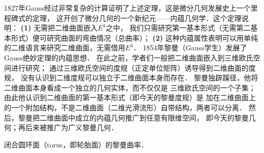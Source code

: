 1827年Gauss经过非常复杂的计算证明了上述定理，这是微分几何发展史上一个里程碑式的定理，
这开创了微分几何的一个新纪元——内蕴几何学．这个定理说明：
{\bfseries (1)} 无需把二维曲面嵌入$E^3$之中，
我们只需研究第一基本形式（无需第二基本形式）便可研究曲面的{\kaishu 弯曲情况}（总曲率）；
{\bfseries (2)} 这种{\kaishu 内蕴}属性表明可以用单纯的二维语言来研究二维曲面，无需借用$E^3$．
1854年黎曼（Gauss学生）发展了Gauss绝妙定理的内蕴思想．
在此之前，学者们一般把二维曲面嵌入到三维欧氏空间进行研究；
通过三维欧氏空间的度规（正定单位矩阵）诱导得到二维曲面的度规，
没有认识到二维度规可以独立于二维曲面本身而存在．
黎曼独辟蹊径，他将二维曲面本身看成一个独立的几何实体，而不仅仅是
三维欧氏空间的一个子集；由此他认识到二维曲面的第一基本形式（即今天的黎曼度规）是
加在二维曲面上的一个附加结构，不是二维曲面（二维光滑流形）自带结构，两者可以分离．
然后，黎曼把二维曲面中成立的内蕴几何推广到任意有限维空间，
即今天的{\kaishu 黎曼几何}；再后来被推广为广义黎曼几何．

\begin{example}\label{chcdg:exm_torus}
	闭合圆环面（torus，即轮胎面）的黎曼曲率．
\end{example}

